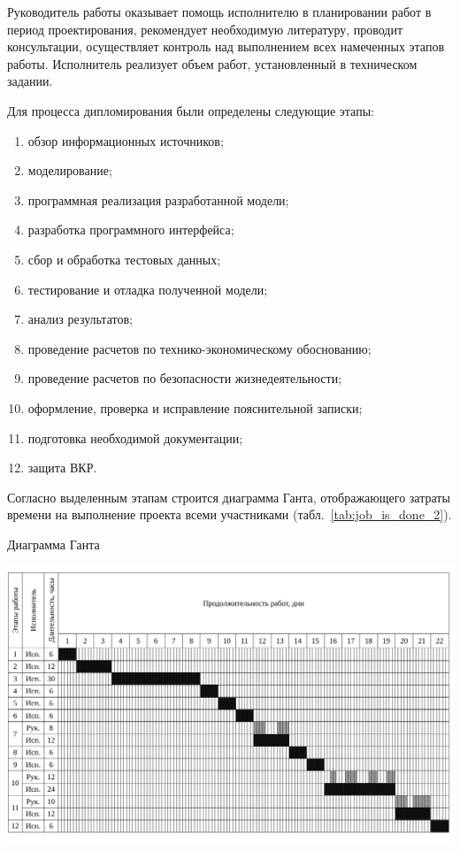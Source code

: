 Руководитель работы оказывает помощь исполнителю в планировании работ в период проектирования, рекомендует
необходимую литературу, проводит консультации, осуществляет контроль над выполнением всех 
намеченных этапов работы. Исполнитель реализует объем работ, установленный в техническом задании.

Для процесса дипломирования были определены следующие этапы:
\begin{enumerate}
 \item обзор информационных источников;
 \item моделирование;
 \item программная реализация разработанной модели;
 \item разработка программного интерфейса;
 \item сбор и обработка тестовых данных;
 \item тестирование и отладка полученной модели;
 \item анализ результатов;
 \item проведение расчетов по технико-экономическому обоснованию;
 \item проведение расчетов по безопасности жизнедеятельности;
 \item оформление, проверка и исправление пояснительной записки;
 \item подготовка необходимой документации;
 \item защита ВКР.
\end{enumerate}


Согласно выделенным этапам строится диаграмма
Ганта, отображающего затраты времени на выполнение проекта всеми
участниками (табл.~\ref{tab:job_is_done_2}).




\begin{table}[!ht]
\caption{Диаграмма Ганта}
\centering
\includegraphics[page=1, width=1\linewidth]{tables/economics/grantt.pdf}
\label{tab:job_is_done_2}
\end{table}

